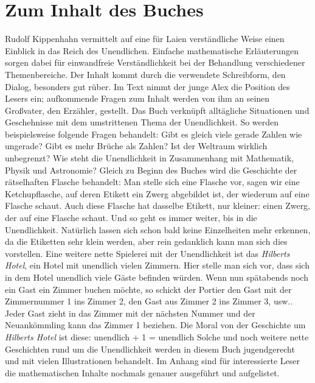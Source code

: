 \documentclass[a4paper,12pt]{article}
\begin{document}
\section{Zum Inhalt des Buches}\newline
Rudolf Kippenhahn vermittelt auf eine für Laien verständliche Weise einen Einblick in das Reich des Unendlichen. Einfache mathematische Erläuterungen sorgen dabei für einwandfreie Verständlichkeit bei der Behandlung verschiedener Themenbereiche.
Der Inhalt kommt durch die verwendete Schreibform, den Dialog, besonders gut rüber. Im Text nimmt der junge Alex die Position des Lesers ein; aufkommende Fragen zum Inhalt werden von ihm an seinen Großvater, den Erzähler, gestellt.
Das Buch verknüpft alltägliche Situationen und Geschehnisse mit dem umstrittenen Thema der Unendlichkeit. So werden beispielsweise folgende Fragen behandelt:\newline
Gibt es gleich viele gerade Zahlen wie ungerade? Gibt es mehr Brüche als Zahlen? Ist der Weltraum wirklich unbegrenzt? Wie steht die Unendlichkeit in Zusammenhang mit Mathematik, Physik und Astronomie?\newline
Gleich zu Beginn des Buches wird die Geschichte der rätselhaften Flasche behandelt: Man stelle sich eine Flasche vor, sagen wir eine Ketchupflasche, auf deren Etikett ein Zwerg abgebildet ist, der wiederum auf eine Flasche schaut. Auch diese Flasche hat dasselbe Etikett, nur kleiner: einen Zwerg, der auf eine Flasche schaut. Und so geht es immer weiter, bis in die Unendlichkeit. Natürlich lassen sich schon bald keine Einzelheiten mehr erkennen, da die Etiketten sehr klein werden, aber rein gedanklich kann man sich dies vorstellen.
Eine weitere nette Spielerei mit der Unendlichkeit ist das \textit{Hilberts Hotel}, ein Hotel mit unendlich vielen Zimmern. Hier stelle man sich vor, dass sich in dem Hotel unendlich viele Gäste befinden würden. Wenn nun spätabends noch ein Gast ein Zimmer buchen möchte, so schickt der Portier den Gast mit der Zimmernummer 1 ins Zimmer 2, den Gast aus Zimmer 2 ins Zimmer 3, usw.. Jeder Gast zieht in das Zimmer mit der nächsten Nummer und der Neuankömmling kann das Zimmer 1 beziehen. Die Moral von der Geschichte um \textit{Hilberts Hotel} ist diese:\newline
\newline
unendlich + 1 = unendlich\newline
\newline
Solche und noch weitere nette Geschichten rund um die Unendlichkeit werden in diesem Buch jugendgerecht und mit vielen Illustrationen behandelt.
Im Anhang sind für interessierte Leser die mathematischen Inhalte nochmals genauer ausgeführt und aufgelistet. \newline
\end{document}
